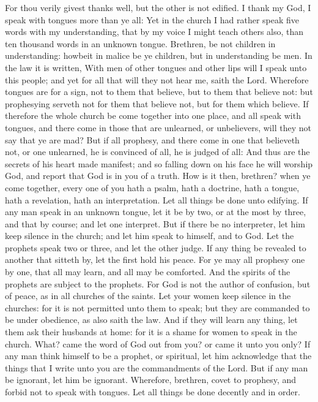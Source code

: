 For thou verily givest thanks well, but the other is not edified.
 I thank my God, I speak with tongues more than ye all:
 Yet in the church I had rather speak five words with my
understanding, that by my voice I might teach others also, than ten
thousand words in an unknown tongue.  Brethren, be not
children in understanding: howbeit in malice be ye children, but in
understanding be men.  In the law it is written, With men
of other tongues and other lips will I speak unto this people; and yet
for all that will they not hear me, saith the Lord. 
Wherefore tongues are for a sign, not to them that believe, but to them
that believe not: but prophesying serveth not for them that believe not,
but for them which believe.  If therefore the whole
church be come together into one place, and all speak with tongues, and
there come in those that are unlearned, or unbelievers, will they not
say that ye are mad?  But if all prophesy, and there come
in one that believeth not, or one unlearned, he is convinced of all, he
is judged of all:  And thus are the secrets of his heart
made manifest; and so falling down on his face he will worship God, and
report that God is in you of a truth.  How is it then,
brethren? when ye come together, every one of you hath a psalm, hath a
doctrine, hath a tongue, hath a revelation, hath an interpretation. Let
all things be done unto edifying.  If any man speak in an
unknown tongue, let it be by two, or at the most by three, and that by
course; and let one interpret.  But if there be no
interpreter, let him keep silence in the church; and let him speak to
himself, and to God.  Let the prophets speak two or
three, and let the other judge.  If any thing be revealed
to another that sitteth by, let the first hold his peace.
 For ye may all prophesy one by one, that all may learn,
and all may be comforted.  And the spirits of the
prophets are subject to the prophets.  For God is not the
author of confusion, but of peace, as in all churches of the saints.
 Let your women keep silence in the churches: for it is
not permitted unto them to speak; but they are commanded to be under
obedience, as also saith the law.  And if they will learn
any thing, let them ask their husbands at home: for it is a shame for
women to speak in the church.  What? came the word of God
out from you? or came it unto you only?  If any man think
himself to be a prophet, or spiritual, let him acknowledge that the
things that I write unto you are the commandments of the Lord.
 But if any man be ignorant, let him be ignorant.
 Wherefore, brethren, covet to prophesy, and forbid not
to speak with tongues.  Let all things be done decently
and in order.

